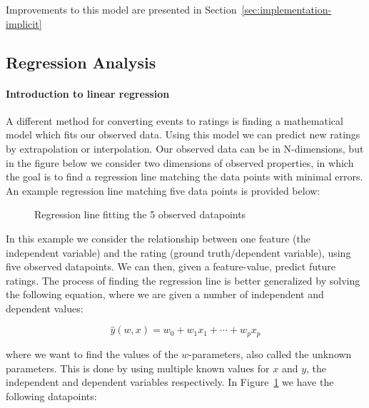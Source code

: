 Improvements to this model are presented in
Section~\ref{sec:implementation-implicit}

\subsection{Regression Analysis}
\label{sec:regression-sota}

\paragraph{Introduction to linear regression}
A different method for converting events to ratings is finding a mathematical
model which fits our observed data. Using this model we can predict new ratings
by extrapolation or interpolation. Our observed data can be in N-dimensions, but
in the figure below we consider two dimensions of observed properties, in which
the goal is to find a regression line matching the data points with minimal
errors. An example regression line matching five data points is provided below:

\begin{figure}[H]
  \centering
  \caption{Regression line fitting the 5 observed datapoints}
  \label{fig-regression}
\end{figure}

In this example we consider the relationship between one feature (the
independent variable) and the rating (ground truth/dependent variable), using
five observed datapoints. We can then, given a feature-value, predict future
ratings. The process of finding the regression line is better generalized by
solving the following equation, where we are given a number of independent and
dependent values:

\begin{equation}
  \hat{y}(w,x) = w_0 + w_1 x_1 + \cdots + w_p x_p
  \label{eq-regression}
\end{equation}

where we want to find the values of the $w$-parameters, also called the unknown
parameters. This is done by using multiple known values for $x$ and $y$, the
independent and dependent variables respectively. In Figure~\ref{fig-regression}
we have the following datapoints:

